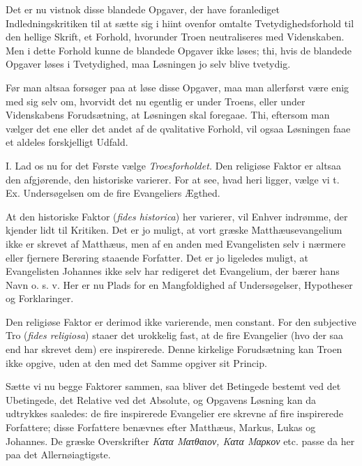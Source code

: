 \documentclass[12pt,a4paper]{book}
\newcommand{\opage}[1]{\marginnote{\footnotesize\textit{[#1]}}}
\begin{document}
Det er nu vistnok disse blandede Opgaver, der have foranlediget
Indledningskritiken til at sætte sig i hiint ovenfor omtalte
Tvetydighedsforhold til den hellige Skrift, et Forhold, hvorunder Troen
neutraliseres med Videnskaben. Men i dette Forhold kunne de blandede Opgaver
ikke løses; thi, hvis de blandede Opgaver løses i Tvetydighed, maa Løsningen jo
selv blive tvetydig.

Før man altsaa forsøger paa at løse disse Opgaver, maa man allerførst være enig
med sig selv om, hvorvidt det nu egentlig er under Troens, eller under
Videnskabens Forudsætning, at Løsningen skal foregaae. Thi, eftersom man vælger
det ene eller det andet af de qvalitative Forhold, vil ogsaa Løsningen faae et
aldeles forskjelligt Udfald.

I. Lad os nu for det Første vælge \emph{Troesforholdet.} Den religiøse Faktor
er altsaa den afgjørende, den historiske varierer. For at see, hvad heri
ligger, vælge vi t. Ex. Undersøgelsen om de fire Evangeliers Ægthed.

At den historiske Faktor (\textit{fides historica}) her varierer, vil Enhver
indrømme, der kjender lidt til Kritiken. Det er jo muligt, at vort græske
Matthæusevangelium ikke er skrevet af Matthæus, men af en anden med Evangelisten
selv i nærmere eller fjernere Berøring staaende Forfatter. Det er jo ligeledes
muligt, at Evangelisten Johannes ikke selv har redigeret det Evangelium, der
bærer hans Navn o. s. v. Her er nu Plads for en Mangfoldighed af Undersøgelser,
Hypotheser og Forklaringer.

\opage{45} Den religiøse Faktor er derimod ikke varierende, men constant. For den
subjective Tro (\textit{fides religiosa}) staaer det urokkelig fast, at de fire
Evangelier (hvo der saa end har skrevet dem) ere inspirerede. Denne kirkelige
Forudsætning kan Troen ikke opgive, uden at den med det Samme opgiver sit
Princip.

Sætte vi nu begge Faktorer sammen, saa bliver det Betingede bestemt ved det
Ubetingede, det Relative ved det Absolute, og Opgavens Løsning kan da udtrykkes
saaledes: de fire inspirerede Evangelier ere skrevne af fire inspirerede
Forfattere; disse Forfattere benævnes efter Matthæus, Markus, Lukas og
Johannes. De græske Overskrifter \textit{Κατα Ματθαιον, Κατα Μαρκον} etc. passe
da her paa det Allernøiagtigste.
\end{document}
